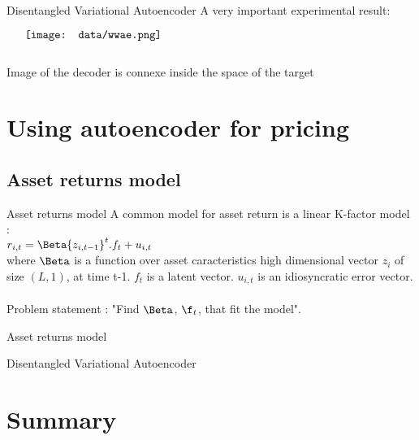 \documentclass{beamer}
\begin{document}
\begin{frame}{Disentangled Variational Autoencoder}
    A very important experimental result: \\
    \begin{minipage}{5in}
    \centering
    $\vcenter{
    \texttt{[image: data/wwae.png]} \\
    }$
    \end{minipage}
    Image of the decoder is connexe inside the space of the target 
\end{frame}

\section{Using autoencoder for pricing}
\subsection{Asset returns model}
\begin{frame}{Asset returns model}
	A common model for asset return is a linear K-factor model : \\
	$r_{i,t} = \Beta{z_{i,t - 1}}^{t}.f_t + u_{i,t}$ \\
	where $\Beta$ is a function over asset caracteristics high dimensional vector $z_i$ of size $(L, 1)$, at time t-1.
	$f_t$ is a latent vector. $u_{i,t}$ is an idiosyncratic error vector. \\
	\\
	Problem statement : "Find $\Beta$, $\f_t$, that fit the model".
\end{frame}

\begin{frame}{Asset returns model}
	
\end{frame}


\begin{frame}{Disentangled Variational Autoencoder}
\end{frame}

 \begin{frame}
 \end{frame} 


\section*{Summary}
\end{document}
